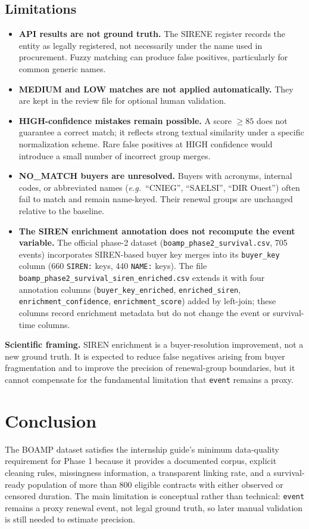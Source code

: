 \documentclass[11pt,a4paper]{article}
\begin{document}
\subsection{Limitations}

\begin{itemize}[noitemsep]
  \item \textbf{API results are not ground truth.} The SIRENE register records
    the entity as legally registered, not necessarily under the name used in
    procurement. Fuzzy matching can produce false positives, particularly for
    common generic names.
  \item \textbf{MEDIUM and LOW matches are not applied automatically.} They are
    kept in the review file for optional human validation.
  \item \textbf{HIGH-confidence mistakes remain possible.} A score $\geq 85$
    does not guarantee a correct match; it reflects strong textual similarity
    under a specific normalization scheme. Rare false positives at HIGH
    confidence would introduce a small number of incorrect group merges.
  \item \textbf{NO\_MATCH buyers are unresolved.} Buyers with acronyms, internal
    codes, or abbreviated names (\emph{e.g.}\ ``CNIEG'', ``SAELSI'', ``DIR
    Ouest'') often fail to match and remain name-keyed. Their renewal groups are
    unchanged relative to the baseline.
  \item \textbf{The SIREN enrichment annotation does not recompute the event variable.}
    The official phase-2 dataset (\nolinkurl{boamp_phase2_survival.csv},
    705 events) incorporates SIREN-based buyer key merges into its
    \texttt{buyer\_key} column (660 \texttt{SIREN:} keys, 440 \texttt{NAME:}
    keys). The file \nolinkurl{boamp_phase2_survival_siren_enriched.csv} extends
    it with four annotation columns (\texttt{buyer\_key\_enriched},
    \texttt{enriched\_siren}, \texttt{enrichment\_confidence},
    \texttt{enrichment\_score}) added by left-join; these columns record
    enrichment metadata but do not change the event or survival-time columns.
\end{itemize}

\textbf{Scientific framing.} SIREN enrichment is a buyer-resolution improvement,
not a new ground truth. It is expected to reduce false negatives arising from
buyer fragmentation and to improve the precision of renewal-group boundaries, but
it cannot compensate for the fundamental limitation that \texttt{event} remains
a proxy.

\section{Conclusion}

The BOAMP dataset satisfies the internship guide's minimum data-quality
requirement for Phase 1 because it provides a documented corpus, explicit
cleaning rules, missingness information, a transparent linking rate, and a
survival-ready population of more than 800 eligible contracts with either
observed or censored duration. The main limitation is conceptual rather than
technical: \texttt{event} remains a proxy renewal event, not legal ground truth,
so later manual validation is still needed to estimate precision.
\end{document}
